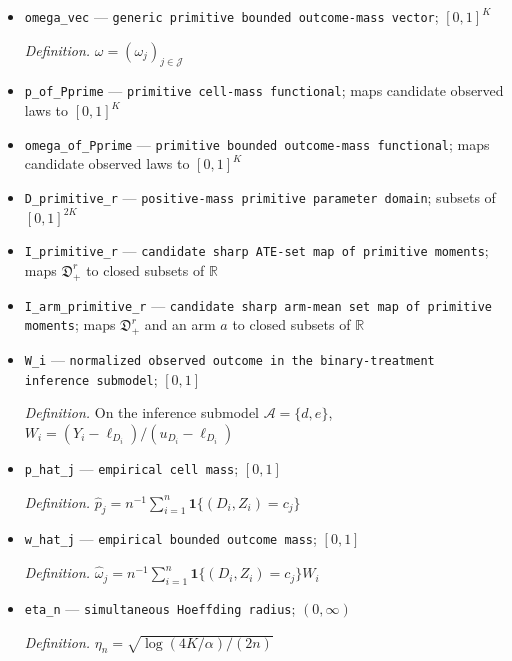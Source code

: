 \documentclass{article}
\begin{document}
\begin{itemize}
  \item \texttt{omega\_\allowbreak{}vec} --- \texttt{generic primitive bounded outcome-\allowbreak{}mass vector}; \([0,1]^K\)
  \par\smallskip\noindent\emph{Definition.} \(\omega=(\omega_j)_{j\in\mathcal J}\)
  \item \texttt{p\_\allowbreak{}of\_\allowbreak{}Pprime} --- \texttt{primitive cell-\allowbreak{}mass functional}; maps candidate observed laws to \([0,1]^K\)
  \item \texttt{omega\_\allowbreak{}of\_\allowbreak{}Pprime} --- \texttt{primitive bounded outcome-\allowbreak{}mass functional}; maps candidate observed laws to \([0,1]^K\)
  \item \texttt{D\_\allowbreak{}primitive\_\allowbreak{}r} --- \texttt{positive-\allowbreak{}mass primitive parameter domain}; subsets of \([0,1]^{2K}\)
  \item \texttt{I\_\allowbreak{}primitive\_\allowbreak{}r} --- \texttt{candidate sharp ATE-\allowbreak{}set map of primitive moments}; maps \(\mathfrak D_+^r\) to closed subsets of \(\mathbb R\)
  \item \texttt{I\_\allowbreak{}arm\_\allowbreak{}primitive\_\allowbreak{}r} --- \texttt{candidate sharp arm-\allowbreak{}mean set map of primitive moments}; maps \(\mathfrak D_+^r\) and an arm \(a\) to closed subsets of \(\mathbb R\)
  \item \texttt{W\_\allowbreak{}i} --- \texttt{normalized observed outcome in the binary-\allowbreak{}treatment inference submodel}; \([0,1]\)
  \par\smallskip\noindent\emph{Definition.} On the inference submodel \(\mathcal A=\{d,e\}\), \(W_i=(Y_i-\ell_{D_i})/(u_{D_i}-\ell_{D_i})\)
  \item \texttt{p\_\allowbreak{}hat\_\allowbreak{}j} --- \texttt{empirical cell mass}; \([0,1]\)
  \par\smallskip\noindent\emph{Definition.} \(\widehat p_j=n^{-1}\sum_{i=1}^n\mathbf 1\{(D_i,Z_i)=c_j\}\)
  \item \texttt{w\_\allowbreak{}hat\_\allowbreak{}j} --- \texttt{empirical bounded outcome mass}; \([0,1]\)
  \par\smallskip\noindent\emph{Definition.} \(\widehat\omega_j=n^{-1}\sum_{i=1}^n\mathbf 1\{(D_i,Z_i)=c_j\}W_i\)
  \item \texttt{eta\_\allowbreak{}n} --- \texttt{simultaneous Hoeffding radius}; \((0,\infty)\)
  \par\smallskip\noindent\emph{Definition.} \(\eta_n=\sqrt{\log(4K/\alpha)/(2n)}\)

\end{itemize}
\end{document}
